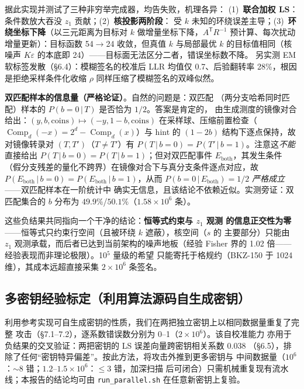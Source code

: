 \documentclass[UTF8,11pt,a4paper]{ctexart}
\newcommand{\Comp}{\operatorname{Comp}}
\newcommand{\code}[1]{\texttt{\small #1}}
\begin{document}
\noindent 据此实现并测试了三种非穷举完成器，均告失败，机理各异：
(1)~\textbf{联合加权 LS}：条件数放大吞没 $z_1$ 贡献；(2)~\textbf{核投影两阶段}：
受 $k$ 未知的环绕误差主导；(3)~\textbf{环绕坐标下降}（以三元距离为目标对 $k$
做增量坐标下降，$A^{\mathsf T}R^{-1}$ 预计算、每次扰动增量更新）：目标函数
54$\to$24 收敛，但真值 $k$ 与局部最优 $k$ 的目标值相同（核噪声
$K\varepsilon$ 的本底即 24）——目标面无法区分二者，错误坐标数不降。
另实测 EM 软标签发散（\S6.4）：模糊签名的校准后 LLR 均值仅 0.7、后验翻转率
28\%，根因是拒绝采样条件化收缩 $\rho$ 同样压缩了模糊签名的双峰似然。

\noindent\textbf{双匹配样本的信息量（严格论证）}。自然的问题是：双匹配
（两分支哈希同时匹配）样本的 $P(b{=}0\,|\,T)$ 是否恰为 $1/2$。答案是肯定的，
由生成测度的镜像对合给出：$(y,b,\mathrm{coins})\mapsto(-y,1-b,\mathrm{coins})$
在采样球、压缩前置检查（$\Comp_d(-x)=2^d-\Comp_d(x)$）与 hint 的 $(1{-}2b)$
结构下逐点保持，故对镜像转录对 $(T,T')$（$T\neq T'$）有
$P(T\,|\,b{=}0)=P(T'\,|\,b{=}1)$。注意这\emph{不能}直接给出
$P(T\,|\,b{=}0)=P(T\,|\,b{=}1)$；但对双匹配事件 $E_{\mathrm{both}}$，其发生条件
（假分支残差的量化不跨界）在镜像对合下与真分支条件逐点对应，故
$P(E_{\mathrm{both}}\,|\,b{=}0)=P(E_{\mathrm{both}}\,|\,b{=}1)$，从而
$P(b{=}0\,|\,E_{\mathrm{both}})=1/2$ \emph{严格成立}——双匹配样本在一阶统计中
确实无信息，且该结论不依赖近似。实测旁证：双匹配集合的 $b$ 分布为
$49.9\%$/$50.1\%$（$1.58\times10^6$ 条）。

\noindent 这些负结果共同指向一个干净的结论：\textbf{恒等式约束与 $z_1$ 观测
的信息正交性为零}——恒等式只约束行空间（且被环绕 $k$ 遮蔽），核空间（$s$ 的
主要部分）只能由 $z_1$ 观测承载，而后者已达到当前架构的噪声地板（经验 Fisher 界的 1.02 倍——经验表现而非理论极限）。10$^5$ 量级的希望
只能寄托于格规约（BKZ-150 于 1024 维），其成本远超直接采集 $2\times10^6$
条签名。

\subsection{多密钥经验标定（利用算法源码自生成密钥）}

利用参考实现可自生成密钥的性质，我们在两把独立密钥上以相同数据量重复了完整
攻击（\S7.1--7.2），逐系数错误数分别为 0--1（$2\times10^6$）。该自校准能力
亦用于负结果的交叉验证：两把密钥的 LS 误差向量跨密钥相关系数 0.038
（\S6.5），排除了任何``密钥特异偏差''。按此方法，将攻击外推到更多密钥与
中间数据量（$10^6$：$\sim8$ 错；$1.2$--$1.5\times10^6$：$\le3$ 错，加深扫描
后可闭合）只需机械重复现有流水线；本报告的结论均可由
\code{run\_parallel.sh} 在任意新密钥上复验。
\end{document}
